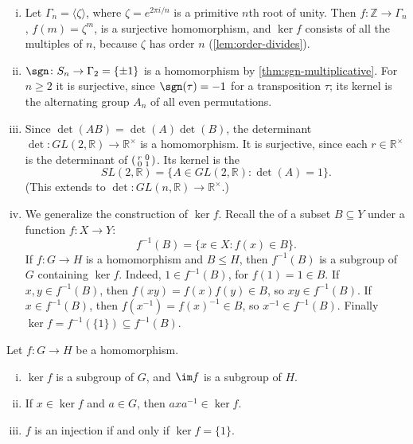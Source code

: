 \begin{eg}\label{eg:kernels}
	\begin{enumerate}[(i)]
		\item Let \(\Gamma_n = \langle\zeta\rangle\), where \(\zeta = e^{2\pi i/n}\) is a
		      primitive \(n\)th root of unity. Then \(f\colon \mathbb Z \to \Gamma_n\),
		      \(f(m) = \zeta^m\), is a surjective homomorphism, and \(\ker f\) consists of
		      all the multiples of \(n\), because \(\zeta\) has order \(n\)
		      (\autoref{lem:order-divides}).
		\item \(\sgn\colon S_n \to \Gamma_2 = \{\pm 1\}\) is a homomorphism by
		      \autoref{thm:sgn-multiplicative}. For \(n \geq 2\) it is surjective, since
		      \(\sgn(\tau) = -1\) for a transposition \(\tau\); its kernel is the alternating
		      group \(A_n\) of all even permutations.
		\item Since \(\det(AB) = \det(A)\det(B)\), the determinant
		      \(\det\colon GL(2,\mathbb R) \to \mathbb R^\times\) is a homomorphism. It is
		      surjective, since
		      each \(r \in \mathbb R^\times\) is the determinant of
		      \(\begin{psmallmatrix} r & 0 \\ 0 & 1 \end{psmallmatrix}\). Its kernel is the
		      \[
			      SL(2,\mathbb R) = \{A \in GL(2,\mathbb R) : \det(A) = 1\}.
		      \]
		      (This extends to \(\det\colon GL(n,\mathbb R) \to \mathbb R^\times\).)
		\item We generalize the construction of \(\ker f\). Recall the 
		      of a subset \(B \subseteq Y\) under a function \(f\colon X \to Y\):
		      \[
			      f^{-1}(B) = \{x \in X : f(x) \in B\}.
		      \]
		      If \(f\colon G \to H\) is a homomorphism and \(B \leq H\), then
		      \(f^{-1}(B)\) is a subgroup of \(G\) containing \(\ker f\). Indeed,
		      \(1 \in f^{-1}(B)\), for \(f(1) = 1 \in B\). If \(x, y \in f^{-1}(B)\), then
		      \(f(xy) = f(x)f(y) \in B\), so \(xy \in f^{-1}(B)\). If \(x \in f^{-1}(B)\),
		      then \(f(x^{-1}) = f(x)^{-1} \in B\), so \(x^{-1} \in f^{-1}(B)\). Finally
		      \(\ker f = f^{-1}(\{1\}) \subseteq f^{-1}(B)\).
	\end{enumerate}
\end{eg}

\begin{proposition}\label{prop:kernel-image}
	Let \(f\colon G \to H\) be a homomorphism.
	\begin{enumerate}[(i)]
		\item \(\ker f\) is a subgroup of \(G\), and \(\im f\) is a subgroup of \(H\).
		\item If \(x \in \ker f\) and \(a \in G\), then \(axa^{-1} \in \ker f\).
		\item \(f\) is an injection if and only if \(\ker f = \{1\}\).
	\end{enumerate}
\end{proposition}

